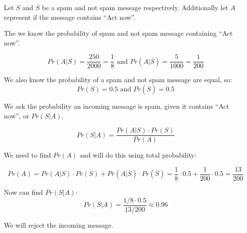 \documentclass[11pt, letterpaper, includehead]{article}
\theoremstyle{plain}
\theoremstyle{mydefinition}
\theoremstyle{myproperty}
\begin{document}
\begin{enumerate}[label=\textbf{\arabic*}., leftmargin=*]
Let $S$ and $\overline{S}$ be a spam and not spam message respectively. Additionally let $A$ represent if the message contains ``Act now''.

The we know the probability of spam and not spam message containing ``Act now''.

\[Pr(A|S) = \frac{250}{2000} = \frac{1}{8} \text{ and } Pr(A| \overline{S}) = \frac{5}{1000} = \frac{1}{200}\]

We also know the probability of a spam and not spam message are equal, so:
\[Pr(S) = 0.5 \text{ and } Pr(\overline{S}) = 0.5\]

We ask the probability an incoming message is spam, given it contains ``Act now'', or $Pr(S|A)$.

\[Pr(S|A) = \frac{Pr(A|S) \cdot Pr(S)}{Pr(A)}\]

We need to find $Pr(A)$ and will do this using total probability:

\[Pr(A) = Pr(A|S) \cdot Pr(S) + Pr(A|\overline{S}) \cdot Pr(\overline{S}) = \frac{1}{8} \cdot 0.5 + \frac{1}{200} \cdot 0.5 = \frac{13}{200}\]

Now can find $Pr(S|A)$:
\[Pr(S|A) = \frac{1/8 \cdot 0.5}{13/200} \approx 0.96\]

We will reject the incoming message.

\end{enumerate}
\end{document}
